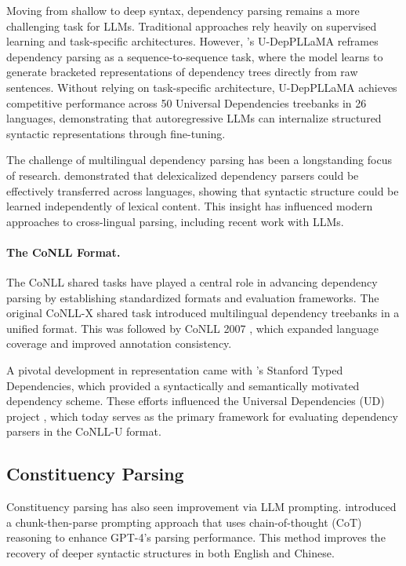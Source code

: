 Moving from shallow to deep syntax, dependency parsing remains a more challenging task for LLMs. Traditional approaches rely heavily on supervised learning and task-specific architectures. However, \citet{hromei2024udeppllama}'s U-DepPLLaMA reframes dependency parsing as a sequence-to-sequence task, where the model learns to generate bracketed representations of dependency trees directly from raw sentences. Without relying on task-specific architecture, U-DepPLLaMA achieves competitive performance across 50 Universal Dependencies treebanks in 26 languages, demonstrating that autoregressive LLMs can internalize structured syntactic representations through fine-tuning.

The challenge of multilingual dependency parsing has been a longstanding focus of research. \citet{mcdonald2011multi} demonstrated that delexicalized dependency parsers could be effectively transferred across languages, showing that syntactic structure could be learned independently of lexical content. This insight has influenced modern approaches to cross-lingual parsing, including recent work with LLMs.

\paragraph{The CoNLL Format.} The CoNLL shared tasks have played a central role in advancing dependency parsing by establishing standardized formats and evaluation frameworks. The original CoNLL-X shared task \citep{buchholz2006conll} introduced multilingual dependency treebanks in a unified format. This was followed by CoNLL 2007 \citep{nivre2007conll}, which expanded language coverage and improved annotation consistency.

A pivotal development in representation came with \citet{de2006generating}'s Stanford Typed Dependencies, which provided a syntactically and semantically motivated dependency scheme. These efforts influenced the Universal Dependencies (UD) project \citep{nivre2016universal}, which today serves as the primary framework for evaluating dependency parsers in the CoNLL-U format.

\subsection{Constituency Parsing}

Constituency parsing has also seen improvement via LLM prompting. \citet{tian2024chunkprompt} introduced a chunk-then-parse prompting approach that uses chain-of-thought (CoT) reasoning to enhance GPT-4’s parsing performance. This method improves the recovery of deeper syntactic structures in both English and Chinese.

